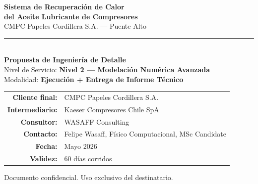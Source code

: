 \documentclass[11pt,a4paper]{article}
\begin{document}
\begin{titlepage}

\vspace*{5cm}

\begin{center}
{\Huge\bfseries\textcolor{wasaffblue}{Sistema de Recuperación de Calor}}\\[0.4cm]
{\Huge\bfseries\textcolor{wasaffblue}{del Aceite Lubricante de Compresores}}\\[0.4cm]
{\LARGE\textcolor{wasaffgray}{CMPC Papeles Cordillera S.A. — Puente Alto}}\\[1.5cm]

\rule{0.6\textwidth}{1pt}\\[0.8cm]

{\Large\textbf{Propuesta de Ingeniería de Detalle}}\\[0.3cm]
{\large Nivel de Servicio: \textbf{Nivel 2 — Modelación Numérica Avanzada}}\\[0.3cm]
{\large Modalidad: \textbf{Ejecución + Entrega de Informe Técnico}}\\[1.5cm]

\begin{tabular}{rl}
\textbf{Cliente final:} & CMPC Papeles Cordillera S.A. \\[0.3em]
\textbf{Intermediario:} & Kaeser Compresores Chile SpA \\[0.3em]
\textbf{Consultor:} & WASAFF Consulting \\[0.3em]
\textbf{Contacto:} & Felipe Wasaff, Físico Computacional, MSc Candidate \\[0.3em]
\textbf{Fecha:} & Mayo 2026 \\[0.3em]
\textbf{Validez:} & 60 días corridos \\
\end{tabular}

\vfill


\vspace{1cm}
{\small Documento confidencial. Uso exclusivo del destinatario.}
\end{center}
\end{titlepage}
\end{document}
